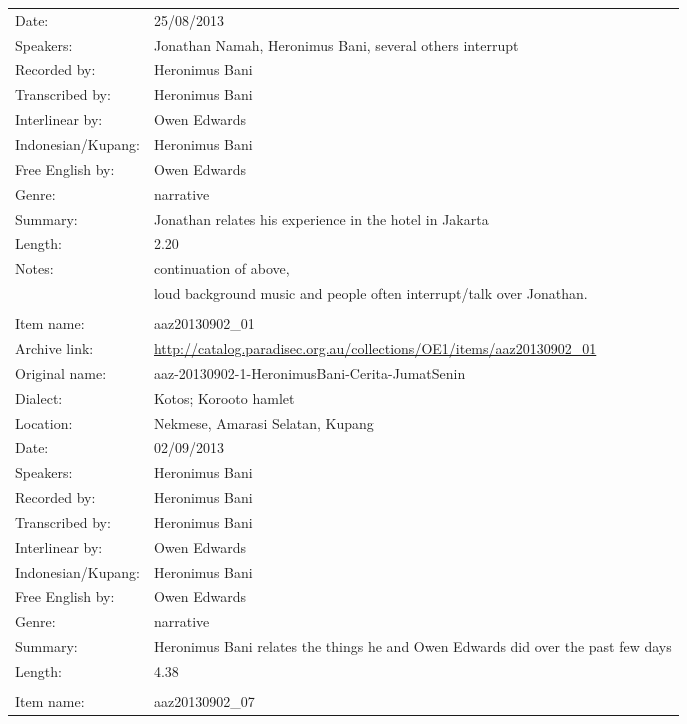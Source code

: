 \begin{longtable}{lL{.67\textwidth}}
Date:				& 25/08/2013\\
Speakers:				& Jonathan Namah, Heronimus Bani, several others interrupt \\
Recorded by:			& Heronimus Bani\\
Transcribed by:		& Heronimus Bani\\
Interlinear by:		& Owen Edwards \\
Indonesian/Kupang:		& Heronimus Bani\\
Free English by:		& Owen Edwards\\
Genre:				& narrative\\
Summary:				& Jonathan relates his experience in the hotel in Jakarta\\
Length:				& 2.20\\
Notes:				& continuation of  above, \\
					& loud background music and people often interrupt/talk over Jonathan. \\ \lspbottomrule
{}			& \\
Item name:			& aaz20130902{\_}01\\
Archive link:			& \url{http://catalog.paradisec.org.au/collections/OE1/items/aaz20130902_01}\\
Original name:			& aaz-20130902-1-HeronimusBani-Cerita-JumatSenin\\
Dialect:				& Kotos; Koro{\Q}oto hamlet \\
Location:				& Nekmese{\Q}, Amarasi Selatan, Kupang \\
Date:				& 02/09/2013\\
Speakers:				& Heronimus Bani\\
Recorded by:			& Heronimus Bani\\
Transcribed by:		& Heronimus Bani\\
Interlinear by:		& Owen Edwards \\
Indonesian/Kupang:		& Heronimus Bani\\
Free English by:		& Owen Edwards\\
Genre:				& narrative\\
Summary:				& Heronimus Bani relates the things he and Owen Edwards did over the past few days\\
Length:				& 4.38\\ \lspbottomrule
{}			& \\
Item name:			& aaz20130902{\_}07\\

\end{longtable}
